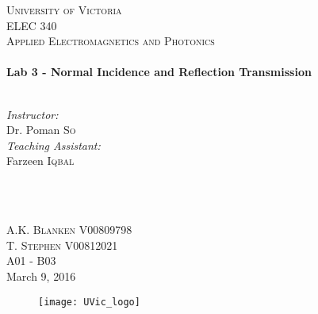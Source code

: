 \begin{titlepage}

\center
 
\textsc{\LARGE University of Victoria}\\[1cm] 	%
\textsc{\Large ELEC 340}\\[0.5cm] 			%
\textsc{\large Applied Electromagnetics and Photonics}\\[0.5cm] 		%


\HRule \\[0.4cm]
{\huge \bfseries Lab 3 - Normal Incidence and Reflection Transmission}\\[0.2cm] %
\HRule \\[1.5cm]
 
 
\begin{minipage}{0.7\textwidth}
\begin{flushleft} 

\large\emph{Instructor:} \\
Dr. Poman \textsc{So} \\
\vspace{12 pt}
\emph{Teaching Assistant:} \\ 
Farzeen \textsc{Iqbal}

\end{flushleft}
\end{minipage}
~
\begin{minipage}{0.1\textwidth}
\begin{flushright} \large

\vspace{12 pt}

\end{flushright}
\end{minipage}\\[2cm]


\Large A.K. \textsc{Blanken}
\large V00809798 \\
\Large T. \textsc{Stephen}
\large V00812021	\\
A01 - B03\\[1.5cm] 


{\large March 9, 2016}\\ %

\begin{figure}[b]
	\centering
	\texttt{[image: UVic\_logo]}
\end{figure}

\end{titlepage}
